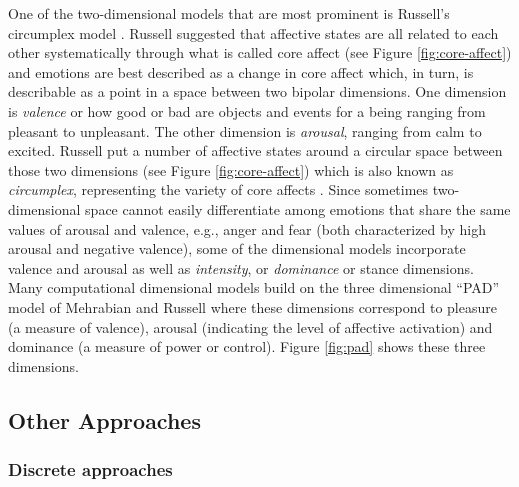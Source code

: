 \documentclass[11pt]{article}
\begin{document}
One of the two-dimensional models that are most prominent is Russell's
circumplex model \cite{russell:circumplex-affect}. Russell suggested that
affective states are all related to each other systematically through what is
called core affect \cite{russell:circumplex-affect,russell:core-affect} (see
Figure \ref{fig:core-affect}) and emotions are best described as a change in
core affect which, in turn, is describable as a point in a space between two
bipolar dimensions. One dimension is \textit{valence} or how good or bad are
objects and events for a being ranging from pleasant to unpleasant. The other
dimension is \textit{arousal}, ranging from calm to excited. Russell put a
number of affective states around a circular space between those two dimensions
(see Figure \ref{fig:core-affect}) which is also known as \textit{circumplex},
representing the variety of core affects
\cite{russell:circumplex-affect,russell:core-affect}. Since sometimes
two-dimensional space cannot easily differentiate among emotions that share the
same values of arousal and valence, e.g., anger and fear (both characterized by
high arousal and negative valence), some of the dimensional models incorporate
valence and arousal as well as \textit{intensity}, or \textit{dominance}
or stance dimensions. Many computational dimensional models build on the three
dimensional “PAD” model of Mehrabian and Russell \cite{mehrabian-russell:pad}
where these dimensions correspond to pleasure (a measure of valence), arousal
(indicating the level of affective activation) and dominance (a measure of power
or control). Figure \ref{fig:pad} shows these three dimensions.

\subsection{Other Approaches}

\subsubsection{Discrete approaches}
\label{sec:discrete-emotions}
\end{document}
